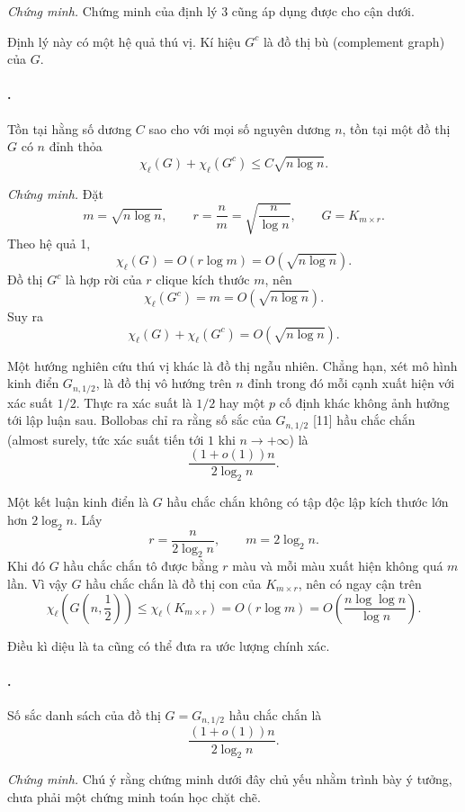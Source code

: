 \documentclass[11pt]{article}
\begin{document}
\emph{Chứng minh.}
Chứng minh của định lý 3 cũng áp dụng được cho cận dưới.

Định lý này có một hệ quả thú vị. Kí hiệu \(G^c\) là đồ thị bù (complement
graph) của \(G\).

\paragraph{.}
Tồn tại hằng số dương \(C\) sao cho với mọi số nguyên dương \(n\), tồn tại một
đồ thị \(G\) có \(n\) đỉnh thỏa
\[
  \chi_{\ell}(G)+\chi_{\ell}(G^c)\le C\sqrt{n\log n}.
\]

\emph{Chứng minh.}
Đặt
\[
  m=\sqrt{n\log n},\qquad r=\frac nm=\sqrt{\frac n{\log n}},
  \qquad G=K_{m\times r}.
\]
Theo hệ quả 1,
\[
  \chi_{\ell}(G)=O(r\log m)=O(\sqrt{n\log n}).
\]
Đồ thị \(G^c\) là hợp rời của \(r\) clique kích thước \(m\), nên
\[
  \chi_{\ell}(G^c)=m=O(\sqrt{n\log n}).
\]
Suy ra
\[
  \chi_{\ell}(G)+\chi_{\ell}(G^c)=O(\sqrt{n\log n}).
\]

Một hướng nghiên cứu thú vị khác là đồ thị ngẫu nhiên. Chẳng hạn, xét mô hình
kinh điển \(G_{n,1/2}\), là đồ thị vô hướng trên \(n\) đỉnh trong đó mỗi cạnh
xuất hiện với xác suất \(1/2\). Thực ra xác suất là \(1/2\) hay một \(p\) cố
định khác không ảnh hưởng tới lập luận sau. Bollobas chỉ ra rằng số sắc của
\(G_{n,1/2}\) [11] hầu chắc chắn (almost surely, tức xác suất tiến tới \(1\)
khi \(n\to+\infty\)) là
\[
  \frac{(1+o(1))n}{2\log_2 n}.
\]

Một kết luận kinh điển là \(G\) hầu chắc chắn không có tập độc lập kích thước
lớn hơn \(2\log_2 n\). Lấy
\[
  r=\frac{n}{2\log_2 n},\qquad m=2\log_2 n.
\]
Khi đó \(G\) hầu chắc chắn tô được bằng \(r\) màu và mỗi màu xuất hiện không
quá \(m\) lần. Vì vậy \(G\) hầu chắc chắn là đồ thị con của \(K_{m\times r}\),
nên có ngay cận trên
\[
  \chi_{\ell}\!\left(G\!\left(n,\frac12\right)\right)
  \le \chi_{\ell}(K_{m\times r})
  =O(r\log m)
  =O\!\left(\frac{n\log\log n}{\log n}\right).
\]

Điều kì diệu là ta cũng có thể đưa ra ước lượng chính xác.

\paragraph{.}
Số sắc danh sách của đồ thị \(G=G_{n,1/2}\) hầu chắc chắn là
\[
  \frac{(1+o(1))n}{2\log_2 n}.
\]

\emph{Chứng minh.}
Chú ý rằng chứng minh dưới đây chủ yếu nhằm trình bày ý tưởng, chưa phải một
chứng minh toán học chặt chẽ.
\end{document}
